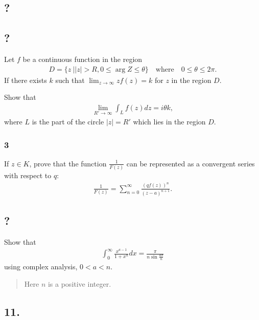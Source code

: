 \hypertarget{section-17}{%
\subsection{?}\label{section-17}}

\hypertarget{section-18}{%
\subsection{?}\label{section-18}}

Let \(f\) be a continuous function in the region
\begin{align*}
D=\{z\ |  |z|>R, 0\leq \arg Z\leq \theta\}\quad\text{where}\quad 0\leq \theta \leq 2\pi
.\end{align*}
If there exists \(k\) such that
\(\displaystyle{\lim_{z\to\infty} zf(z)=k}\) for \(z\) in the region
\(D\).

Show that
\begin{align*}\lim_{R'\to\infty} \int_{L} f(z) dz=i\theta k,\end{align*}
where \(L\) is the part of the circle \(|z|=R'\) which lies in the
region \(D\).

\hypertarget{section-19}{%
\subsubsection{3}\label{section-19}}

If \(z\in K\), prove that the function \(\displaystyle{\frac{1}{F(z)}}\)
can be represented as a convergent series with respect to \(q\):
\begin{align*}
\displaystyle{
\frac{1}{F(z)}=\sum_{n=0}^{\infty} \frac{(qf(z))^n}{(z-a)^{n+1}}.}\end{align*}

\hypertarget{section-20}{%
\subsection{?}\label{section-20}}

Show that
\begin{align*}
\displaystyle \int_0^\infty \frac{x^{a-1}}{1+x^n} dx=\frac{\pi}{n\sin \frac{a\pi}{n}}
\end{align*}
using complex analysis, \(0< a < n\).

\begin{quote}
Here \(n\) is a positive integer.
\end{quote}

\hypertarget{section-21}{%
\subsection{11.}\label{section-21}}

